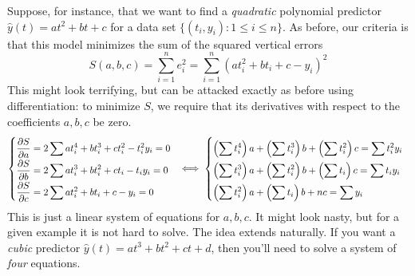 Suppose, for instance, that we want to find a \emph{quadratic} polynomial predictor $\hat y(t)=at^2+bt+c$ for a data set $\big\{(t_i,y_i):1\le i\le n\big\}$. As before, our criteria is that this model minimizes the sum of the squared vertical errors
\[
	S(a,b,c)=\sum_{i=1}^n e_i^2=\sum_{i=1}^n(at_i^2+bt_i+c-y_i)^2
\]
This might look terrifying, but can be attacked exactly as before using differentiation: to minimize $S$, we require that its derivatives with respect to the coefficients $a,b,c$ be zero.
\begin{gather*}
	\def\arraystretch{1.9}
	\left\{
	\begin{array}{@{}lll}
		\displaystyle\partials[S]{a}=2\sum at_i^4+bt_i^3+ct_i^2-t_i^2y_i=0\\
		\displaystyle\partials[S]{b}=2\sum at_i^3+bt_i^2+ct_i-t_iy_i=0\\
		\displaystyle\partials[S]{c}=2\sum at_i^2+bt_i+c-y_i=0
	\end{array}
	\right.
	\iff
	\left\{
	\begin{array}{@{}lll}
		\displaystyle \left(\sum t_i^4\right)a +\left(\sum t_i^3\right)b +\left(\sum t_i^2\right)c =\sum t_i^2y_i\\
		\displaystyle \left(\sum t_i^3\right)a +\left(\sum t_i^2\right)b +\left(\sum t_i\right)c =\sum t_iy_i\\
		\displaystyle \left(\sum t_i^2\right)a +\left(\sum t_i\right)b +nc =\sum y_i
	\end{array}
	\right.
\end{gather*}
This is just a linear system of equations for $a,b,c$. It might look nasty, but for a given example it is not hard to solve. The idea extends naturally. If you want a \emph{cubic} predictor $\hat y(t)=at^3+bt^2+ct+d$, then you'll need to solve a system of \emph{four} equations.

